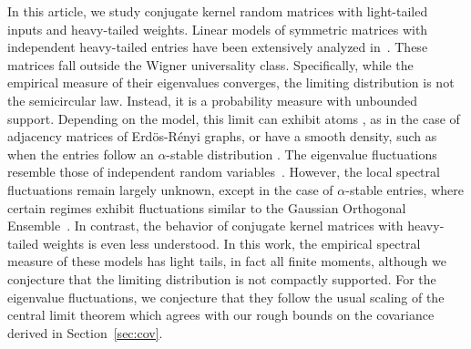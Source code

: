 In this article, we study conjugate kernel random matrices with light-tailed inputs and heavy-tailed weights. Linear models of symmetric matrices with independent heavy-tailed entries have been extensively analyzed in~\cite{zakarevich2006,benarous2008,bordenave2011,bordenave2011bis}. These matrices fall outside the Wigner universality class. Specifically, while the empirical measure of their eigenvalues converges, the limiting distribution is not the semicircular law. Instead, it is a probability measure with unbounded support. Depending on the model, this limit can exhibit atoms \cite{salez2015}, as in the case of adjacency matrices of Erd\"os-R\'enyi graphs, or have a smooth density, such as when the entries follow an \(\alpha\)-stable distribution \cite{Belinschi2009}. The eigenvalue fluctuations resemble those of independent random variables~\cite{BGM}. However, the local spectral fluctuations remain largely unknown, except in the case of \(\alpha\)-stable entries, where certain regimes exhibit fluctuations similar to the Gaussian Orthogonal Ensemble~\cite{bordenave2013,bordenave2017,aggarwal2021}. In contrast, the behavior of conjugate kernel matrices with heavy-tailed weights is even less understood. In this work, the empirical spectral measure of these models has light tails, in fact all finite moments, although we conjecture that the limiting distribution is not compactly supported. For the eigenvalue fluctuations, we conjecture that they follow the usual scaling of the central limit theorem which agrees with our rough bounds on the covariance derived in Section~\ref{sec:cov}.